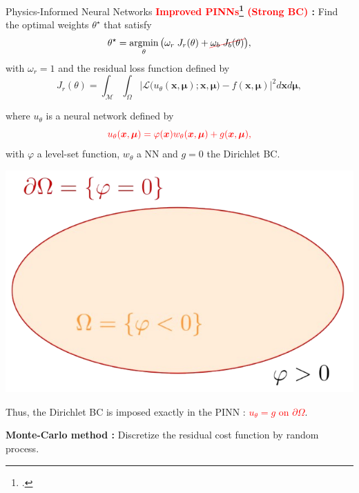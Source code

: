 \begin{frame}[noframenumbering]{Physics-Informed Neural Networks}
	\textbf{\textcolor{red}{Improved PINNs\footcite{LagLikFot1998,FraMicNav2024} (Strong BC)} :} Find the optimal weights $\theta^\star$ that satisfy
	\begin{equation*}
		\theta^\star = \argmin_{\theta}	\big( \omega_r \; J_r(\theta) + \Ccancel[red]{\omega_b \; J_b(\theta)} \big),%
	\end{equation*}
	with $\omega_r=1$ and the residual loss function defined by
	\begin{equation*}
		J_r(\theta) =
		\int_{\mathcal{M}}\int_{\Omega}
		\big| \mathcal{L}\big(u_\theta(\bm{x},\bm{\mu});\bm{x},\bm{\mu}\big)-f(\bm{x},\bm{\mu}) \big|^2 d\bm{x} d\bm{\mu},
	\end{equation*}
	\begin{minipage}{0.75\linewidth}
		where $u_\theta$ is a neural network defined by
		\begin{equation*}
			\textcolor{red}{u_{\theta}(\bm{x},\bm{\mu}) = \varphi(\bm{x}) w_{\theta}(\bm{x},\bm{\mu}) + g(\bm{x},\bm{\mu}),}
		\end{equation*}
		with $\varphi$ a level-set function, $w_\theta$ a NN and $g=0$ the Dirichlet BC. 
	\end{minipage}
	\begin{minipage}{0.23\linewidth}
		\vspace{-15pt}
		\hspace{-23pt}\includegraphics[width=1.3\linewidth]{images/intro/levelset.png}
	\end{minipage}

	Thus, the Dirichlet BC is imposed exactly in the PINN : \textcolor{red}{$u_{\theta} = g$ on $\partial \Omega$}.

	\vspace{5pt}
	\textbf{Monte-Carlo method :} Discretize the residual cost function by random process.
	\vspace{15pt}
\end{frame}


